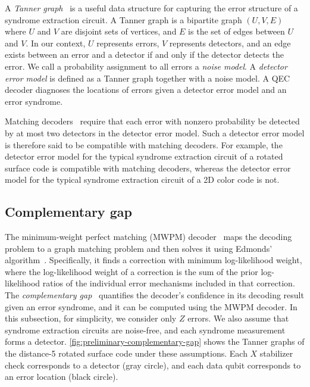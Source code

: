 A \textit{Tanner graph}~\cite{tanner2003recursive,loeliger2004introduction} is a useful data structure for capturing the error structure of a syndrome extraction circuit.
A Tanner graph is a bipartite graph $(U, V, E)$ where $U$ and $V$ are disjoint sets of vertices, and $E$ is the set of edges between $U$ and $V$.
In our context, $U$ represents errors, $V$ represents detectors, and an edge exists between an error and a detector if and only if the detector detects the error.
We call a probability assignment to all errors a \textit{noise model}.
A \textit{detector error model} is defined as a Tanner graph together with a noise model.
A QEC decoder diagnoses the locations of errors given a detector error model and an error syndrome.

Matching decoders~\cite{brown2023conservation} require that each error with nonzero probability be detected by at most two detectors in the detector error model.
Such a detector error model is therefore said to be compatible with matching decoders.
For example, the detector error model for the typical syndrome extraction circuit of a rotated surface code is compatible with matching decoders, whereas the detector error model for the typical syndrome extraction circuit of a 2D color code is not.

\subsection{Complementary gap}
\label{subsec:preliminary-complementary-gap}
The minimum-weight perfect matching (MWPM) decoder~\cite{fowler2012towards} maps the decoding problem to a graph matching problem and then solves it using Edmonds' algorithm~\cite{edmonds1965paths, edmonds1965maximum}.
Specifically, it finds a correction with minimum log-likelihood weight, where the log-likelihood weight of a correction is the sum of the prior log-likelihood ratios of the individual error mechanisms included in that correction.
The \textit{complementary gap}~\cite{gidney2025yoked} quantifies the decoder's confidence in its decoding result given an error syndrome, and it can be computed using the MWPM decoder.
In this subsection, for simplicity, we consider only $Z$ errors.
We also assume that syndrome extraction circuits are noise-free, and each syndrome measurement forms a detector.
\autoref{fig:preliminary-complementary-gap} shows the Tanner graphs of the distance-5 rotated surface code under these assumptions.
Each $X$ stabilizer check corresponds to a detector (gray circle), and each data qubit corresponds to an error location (black circle).

